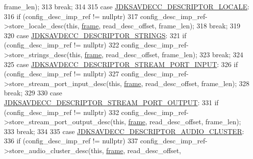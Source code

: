 \begin{DoxyCode}
      frame\_len);
313                 \textcolor{keywordflow}{break};
314 
315             \textcolor{keywordflow}{case} \hyperlink{group__descriptor_ga5d552305c1813a87f014a434e974be4c}{JDKSAVDECC\_DESCRIPTOR\_LOCALE}:
316                 \textcolor{keywordflow}{if} (config\_desc\_imp\_ref != \textcolor{keyword}{nullptr})
317                     config\_desc\_imp\_ref->store\_locale\_desc(\textcolor{keyword}{this}, \hyperlink{gst__avb__playbin_8c_ac8e710e0b5e994c0545d75d69868c6f0}{frame}, read\_desc\_offset, frame\_len);
318                 \textcolor{keywordflow}{break};
319 
320             \textcolor{keywordflow}{case} \hyperlink{group__descriptor_gaa93804189e6bcc937a95be69d6a6294b}{JDKSAVDECC\_DESCRIPTOR\_STRINGS}:
321                 \textcolor{keywordflow}{if} (config\_desc\_imp\_ref != \textcolor{keyword}{nullptr})
322                     config\_desc\_imp\_ref->store\_strings\_desc(\textcolor{keyword}{this}, \hyperlink{gst__avb__playbin_8c_ac8e710e0b5e994c0545d75d69868c6f0}{frame}, read\_desc\_offset, frame\_len);
323                 \textcolor{keywordflow}{break};
324 
325             \textcolor{keywordflow}{case} \hyperlink{group__descriptor_gabf97c9389e49a8c27f2192854f830eda}{JDKSAVDECC\_DESCRIPTOR\_STREAM\_PORT\_INPUT}:
326                 \textcolor{keywordflow}{if} (config\_desc\_imp\_ref != \textcolor{keyword}{nullptr})
327                     config\_desc\_imp\_ref->store\_stream\_port\_input\_desc(\textcolor{keyword}{this}, 
      \hyperlink{gst__avb__playbin_8c_ac8e710e0b5e994c0545d75d69868c6f0}{frame}, read\_desc\_offset, frame\_len);
328                 \textcolor{keywordflow}{break};
329 
330             \textcolor{keywordflow}{case} \hyperlink{group__descriptor_gab28f87a9e7610f8441c1c4840d2c2fb9}{JDKSAVDECC\_DESCRIPTOR\_STREAM\_PORT\_OUTPUT}:
331                 \textcolor{keywordflow}{if} (config\_desc\_imp\_ref != \textcolor{keyword}{nullptr})
332                     config\_desc\_imp\_ref->store\_stream\_port\_output\_desc(\textcolor{keyword}{this}, 
      \hyperlink{gst__avb__playbin_8c_ac8e710e0b5e994c0545d75d69868c6f0}{frame}, read\_desc\_offset, frame\_len);
333                 \textcolor{keywordflow}{break};
334 
335             \textcolor{keywordflow}{case} \hyperlink{group__descriptor_ga3ed17cacf96ccf5d857a20c71d02f426}{JDKSAVDECC\_DESCRIPTOR\_AUDIO\_CLUSTER}:
336                 \textcolor{keywordflow}{if} (config\_desc\_imp\_ref != \textcolor{keyword}{nullptr})
337                     config\_desc\_imp\_ref->store\_audio\_cluster\_desc(\textcolor{keyword}{this}, \hyperlink{gst__avb__playbin_8c_ac8e710e0b5e994c0545d75d69868c6f0}{frame}, read\_desc\_offset, 

\end{DoxyCode}
